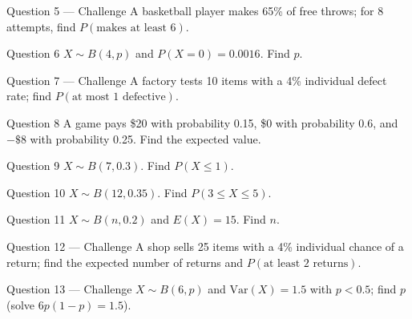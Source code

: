 \documentclass[11pt]{article}
\begin{document}
\begin{qbox}{Question 5 --- Challenge}
A basketball player makes 65\% of free throws; for 8 attempts, find $P(\text{makes at least 6})$.\workspace{3.4cm}
\end{qbox}

\begin{qbox}{Question 6}
$X\sim B(4,p)$ and $P(X=0)=0.0016$. Find $p$.\workspace{2.4cm}
\end{qbox}

\begin{qbox}{Question 7 --- Challenge}
A factory tests 10 items with a 4\% individual defect rate; find $P(\text{at most 1 defective})$.\workspace{3.4cm}
\end{qbox}

\begin{qbox}{Question 8}
A game pays \$20 with probability 0.15, \$0 with probability 0.6, and $-\$8$ with probability 0.25. Find the expected value.\workspace{2.4cm}
\end{qbox}

\begin{qbox}{Question 9}
$X\sim B(7,0.3)$. Find $P(X\leq1)$.\workspace{2.4cm}
\end{qbox}

\begin{qbox}{Question 10}
$X\sim B(12,0.35)$. Find $P(3\leq X\leq5)$.\workspace{2.4cm}
\end{qbox}

\begin{qbox}{Question 11}
$X\sim B(n,0.2)$ and $E(X)=15$. Find $n$.\workspace{2.4cm}
\end{qbox}

\begin{qbox}{Question 12 --- Challenge}
A shop sells 25 items with a 4\% individual chance of a return; find the expected number of returns and $P(\text{at least 2 returns})$.\workspace{3.4cm}
\end{qbox}

\begin{qbox}{Question 13 --- Challenge}
$X\sim B(6,p)$ and $\text{Var}(X)=1.5$ with $p<0.5$; find $p$ (solve $6p(1-p)=1.5$).\workspace{3.2cm}
\end{qbox}

\clearpage
{}
\end{document}
